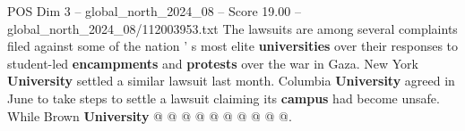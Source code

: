 \begin{textsample}{POS Dim 3 – global\_north\_2024\_08 – Score 19.00 – global\_north\_2024\_08/112003953.txt}
The lawsuits are among several complaints filed against some of the nation ' s most elite \textbf{universities} over their responses to student-led \textbf{encampments} and \textbf{protests} over the war in Gaza.
New York \textbf{University} settled a similar lawsuit last month.
Columbia \textbf{University} agreed in June to take steps to settle a lawsuit claiming its \textbf{campus} had become unsafe.
While Brown \textbf{University} @ @ @ @ @ @ @ @ @ @.

\end{textsample}

